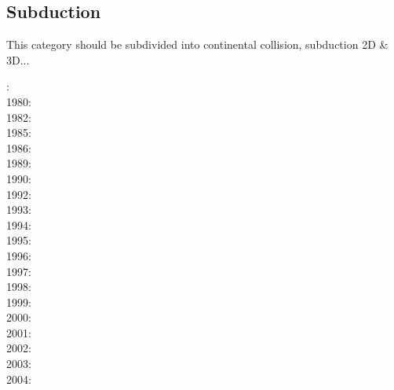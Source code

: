 {\scriptsize
\noindent
\cite{bocs03}
\cite{wahh12}
\cite{vagd13a,vagd13b}\cite{milp13}\cite{myhi13}
\cite{vamd14}
\cite{hevg15}
\cite{gofv18}\cite{hefg18}\cite{hegv18}
\cite{vawg19}
}

\subsection{Subduction} 
This category should be subdivided into continental collision, subduction 2D \& 3D...

{\scriptsize
{}: \cite{haoc78}\\
1980: \cite{mera80}\\
1982: \cite{crpi82}\\
1985: \cite{thar85}\\
1986: \cite{jarr86}\cite{mipb96}\\
1989: \cite{boww89}\cite{mibj89}\\
1990: \cite{hstt90}\cite{kiha90}\\
1992: \cite{zhgu92}\cite{whbw92}\cite{gurn92}\\
1993: \cite{jope93}\cite{dvnm93}\cite{wibf93}\cite{shem93}\\
1994: \cite{zhgu94}\cite{wibe94}\cite{wdbo94a}\cite{wdbo94b}\cite{bequ94}\cite{gaha94}\\
1995: \cite{masa95}\\
1996: \cite{chri96}\cite{gisb96}\cite{wabe96}\cite{zhgu96}\\
1997: \cite{hajc97}\cite{kisa97}\cite{olwh97}\cite{nesg97}\\
1998: \cite{itki98}\cite{buwg98}\cite{brmy98}\cite{jabf98}\cite{wabb98}\\
1999: \cite{hagu99}\cite{befo99}\cite{bumo99}\cite{roda99}\cite{elbp99}\cite{scmr99}\cite{elbe99}
      \cite{beep99}\cite{nesb99}\\
2000: \cite{tesc00}\cite{brky00}\cite{bemh00}\cite{chlb00}\\
2001: \cite{bujl01}\cite{bugw01}\cite{chys01}\cite{coha01}\\
2002: \cite{civv02}\cite{clbb02}\cite{gesp02}\cite{ster02}\cite{jabn02}\\
2003: \cite{refm03}\cite{fumr03}\cite{gehd03}\cite{bigs03}\\
2004: \cite{toba04}\cite{bocj04}\cite{bejn04}\cite{tobj04}\cite{sche04}\cite{sche04b}\cite{enwi04}
      \cite{geys04}\\
}
